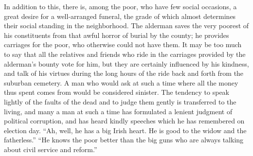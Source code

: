 \documentclass[]{article}
\begin{document}
\begin{sectionbody}
\addamsparagraph In addition to this, there is, among the poor, who have few social
occasions, a great desire for a well-arranged funeral, the grade of
which almost determines their social standing in the neighborhood. The
alderman saves the very poorest of his constituents from that awful
horror of burial by the county; he provides carriages for the poor, who
otherwise could not have them. It may be too much to say that all the
relatives and friends who ride in the carriages provided by the
alderman's bounty vote for him, but they are certainly influenced by his
kindness, and talk of his virtues during the long hours of the ride back
and forth from the suburban cemetery. A man who would ask at such a time
where all the money thus spent comes from would be considered sinister.
The tendency to speak lightly of the faults of the dead and to judge
them gently is transferred to the living, and many a man at such a time
has formulated a lenient judgment of political corruption, and has heard
kindly speeches which he has remembered on election day. ``Ah, well, he
has a big Irish heart. He is good to the widow and the fatherless.'' ``He
knows the poor better than the big guns who are always talking about
civil service and reform.''


\end{sectionbody}
\end{document}
